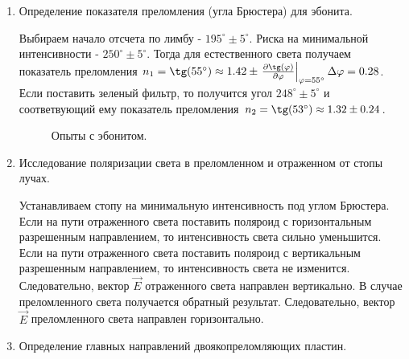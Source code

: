 \documentclass[a4paper,12pt]{article}
\renewcommand{\phi}{\ensuremath{\varphi}}
\theoremstyle{plain} %
\theoremstyle{definition} %
\theoremstyle{remark} %
\begin{document}
\begin{enumerate}
	\item Определение показателя преломления (угла Брюстера) для эбонита.
	 
	 Выбираем начало отсчета по лимбу - $195^{\circ} \pm 5^{\circ}$. Риска на минимальной интенсивности - $250^{\circ} \pm 5^{\circ}$. Тогда для естественного света получаем показатель преломления $n_1 = \tg(55^{\circ}) \approx 1.42 \pm \left.\frac{\partial \tg(\phi)}{\partial \phi}\right|_{\phi = 55^{\circ}}\Delta\phi=0.28 $. Если поставить зеленый фильтр, то получится угол $248^{\circ} \pm 5^{\circ}$ и соответвующий ему показатель преломления $n_2 = \tg(53^{\circ}) \approx 1.32 \pm 0.24$.
	 \begin{figure}[h!]
	 	\caption{Опыты с эбонитом.}
	 \end{figure}
	 
	\item Исследование поляризации света в преломленном и отраженном от стопы лучах.
	
	Устанавливаем стопу на минимальную интенсивность под углом Брюстера. Если на пути отраженного света поставить поляроид с горизонтальным разрешенным направлением, то интенсивность света сильно уменьшится. Если на пути отраженного света поставить поляроид с вертикальным разрешенным направлением, то интенсивность света не изменится. Следовательно, вектор $\vec{E}$ отраженного света направлен вертикально. В случае преломленного света получается обратный результат. Следовательно, вектор $\vec{E}$ преломленного света направлен горизонтально.
	
	\item Определение главных направлений двоякопреломляющих пластин.
	

\end{enumerate}
\end{document}
